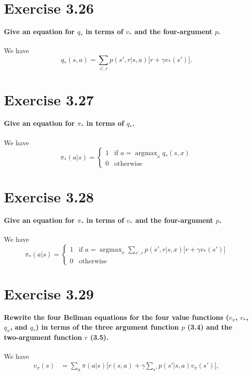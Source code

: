 \documentclass[a4paper,11pt]{article}
\numberwithin{equation}{section}
\theoremstyle{remark}
\DeclareMathOperator*{\argmax}{argmax}
\begin{document}
\section{Exercise 3.26}

\textbf{Give an equation for $q_*$ in terms of $v_*$ and the four-argument $p$.}
\\ \\
We have 
\[
	q_*(s, a) = \sum_{s', r} p(s', r | s, a) \big[r + \gamma v_*(s')\big].
\]


\section{Exercise 3.27}

\textbf{Give an equation for $\pi_*$ in terms of $q_*$.}
\\ \\
We have 
\begin{equation*}
	\pi_*(a | s) = \begin{cases}
						1 &\text{if } a = \argmax_x q_*(s, x) \\
						0 &\text{otherwise }
					\end{cases}
\end{equation*}


\section{Exercise 3.28}

\textbf{Give an equation for $\pi_*$ in terms of $v_*$ and the four-argument $p$.}
\\ \\
We have 
\begin{equation*}
	\pi_*(a | s) = \begin{cases}
						1 &\text{if } a = \argmax_x \sum_{s', r} p(s', r | s, x) \big[r + \gamma v_*(s')\big] \\
						0 &\text{otherwise }
					\end{cases}
\end{equation*}


\section{Exercise 3.29}

\textbf{Rewrite the four Bellman equations for the four value functions ($v_\pi$, $v_*$, $q_\pi$, and $q_*$) in terms of the three argument function $p$ (3.4) and the two-argument function $r$ (3.5).}
\\ \\
We have
\begin{align*}
	v_\pi(s) & = \sum_{a} \pi(a | s) \Big[ r(s, a) + \gamma \sum_{s'} p(s' | s, a) v_\pi(s') \Big],
\end{align*}
\end{document}
